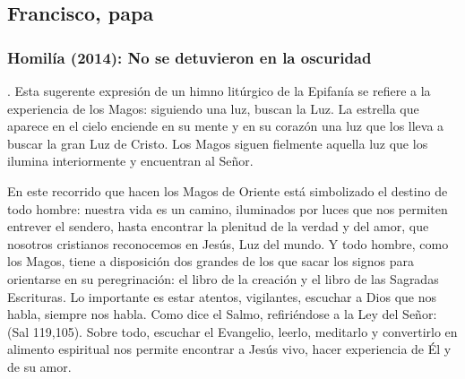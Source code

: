 \newsection

		\subsection{Francisco, papa}
		
			\subsubsection{Homilía (2014): No se detuvieron en la oscuridad}
			
				
				\begin{body}
						. Esta sugerente expresión de un himno litúrgico de la Epifanía se refiere a la experiencia de los Magos: siguiendo una luz, buscan la Luz. La estrella que aparece en el cielo enciende en su mente y en su corazón una luz que los lleva a buscar la gran Luz de Cristo. Los Magos siguen fielmente aquella luz que los ilumina interiormente y encuentran al Señor.
					
					En este recorrido que hacen los Magos de Oriente está simbolizado el destino de todo hombre: nuestra vida es un camino, iluminados por luces que nos permiten entrever el sendero, hasta encontrar la plenitud de la verdad y del amor, que nosotros cristianos reconocemos en Jesús, Luz del mundo. Y todo hombre, como los Magos, tiene a disposición dos grandes  de los que sacar los signos para orientarse en su peregrinación: el libro de la creación y el libro de las Sagradas Escrituras. Lo importante es estar atentos, vigilantes, escuchar a Dios que nos habla, siempre nos habla. Como dice el Salmo, refiriéndose a la Ley del Señor:  (Sal 119,105). Sobre todo, escuchar el Evangelio, leerlo, meditarlo y convertirlo en alimento espiritual nos permite encontrar a Jesús vivo, hacer experiencia de Él y de su amor.
					

\end{body}
